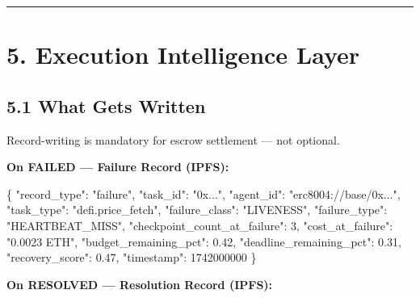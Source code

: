 \documentclass[
  10pt,
]{article}
\newenvironment{Shaded}{}{}
\newcommand{\DataTypeTok}[1]{\textcolor[rgb]{0.56,0.13,0.00}{#1}}
\newcommand{\DecValTok}[1]{\textcolor[rgb]{0.25,0.63,0.44}{#1}}
\newcommand{\FloatTok}[1]{\textcolor[rgb]{0.25,0.63,0.44}{#1}}
\newcommand{\FunctionTok}[1]{\textcolor[rgb]{0.02,0.16,0.49}{#1}}
\newcommand{\StringTok}[1]{\textcolor[rgb]{0.25,0.44,0.63}{#1}}
\begin{document}
\begin{center}\rule{0.5\linewidth}{0.5pt}\end{center}

\hypertarget{execution-intelligence-layer}{%
\section{5. Execution Intelligence
Layer}\label{execution-intelligence-layer}}

\hypertarget{what-gets-written}{%
\subsection{5.1 What Gets Written}\label{what-gets-written}}

Record-writing is mandatory for escrow settlement --- not optional.

\textbf{On FAILED --- Failure Record (IPFS):}

\begin{Shaded}
\begin{Highlighting}[]
\FunctionTok{\{}
  \DataTypeTok{"record\_type"}\FunctionTok{:} \StringTok{"failure"}\FunctionTok{,}
  \DataTypeTok{"task\_id"}\FunctionTok{:} \StringTok{"0x..."}\FunctionTok{,}
  \DataTypeTok{"agent\_id"}\FunctionTok{:} \StringTok{"erc8004://base/0x..."}\FunctionTok{,}
  \DataTypeTok{"task\_type"}\FunctionTok{:} \StringTok{"defi.price\_fetch"}\FunctionTok{,}
  \DataTypeTok{"failure\_class"}\FunctionTok{:} \StringTok{"LIVENESS"}\FunctionTok{,}
  \DataTypeTok{"failure\_type"}\FunctionTok{:} \StringTok{"HEARTBEAT\_MISS"}\FunctionTok{,}
  \DataTypeTok{"checkpoint\_count\_at\_failure"}\FunctionTok{:} \DecValTok{3}\FunctionTok{,}
  \DataTypeTok{"cost\_at\_failure"}\FunctionTok{:} \StringTok{"0.0023 ETH"}\FunctionTok{,}
  \DataTypeTok{"budget\_remaining\_pct"}\FunctionTok{:} \FloatTok{0.42}\FunctionTok{,}
  \DataTypeTok{"deadline\_remaining\_pct"}\FunctionTok{:} \FloatTok{0.31}\FunctionTok{,}
  \DataTypeTok{"recovery\_score"}\FunctionTok{:} \FloatTok{0.47}\FunctionTok{,}
  \DataTypeTok{"timestamp"}\FunctionTok{:} \DecValTok{1742000000}
\FunctionTok{\}}
\end{Highlighting}
\end{Shaded}

\textbf{On RESOLVED --- Resolution Record (IPFS):}
\end{document}
